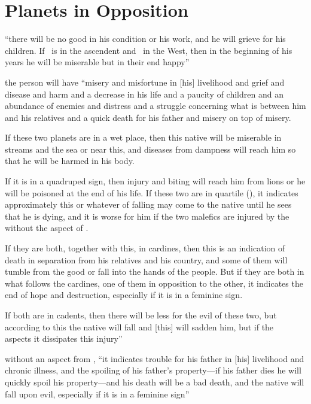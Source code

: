 \section{Planets in Opposition}
\begin{description}[style=multiline,leftmargin=1.5cm]
\item[\Saturn\Opposition\Jupiter]
``there will be no good in his condition or his work, and he will grieve for his children. If \Saturn\, is in the ascendent and \Jupiter\, in the West, then in the beginning of his years he will be miserable but in their end happy''

\item[\Saturn\Opposition\Mars] 
the person will have ``misery and misfortune in [his] livelihood and grief and disease and harm and a decrease in his life and a paucity of children and an abundance of enemies and distress and a struggle concerning what is between him and his relatives and a quick death for his father and misery on top of misery. 

If these two planets are in a wet place, then this native will be miserable in streams and the sea or near this, and diseases from dampness will reach him so that he will be harmed in his body. 

If it is in a quadruped sign, then injury and biting will reach him from lions or he will be poisoned at the end of his life. If these two are in quartile (\Square), it indicates approximately this or whatever of falling may come to the native until he sees that he is dying, and it is worse for him if the two malefics are injured by the \Moon\, without the aspect of \Jupiter. 

If they are both, together with this, in cardines, then this is an indication of death in separation from his relatives and his country, and some of them will tumble from the good or fall into the hands of the people. But if they are both in what follows the cardines, one of them in opposition to the other, it indicates the end of hope and destruction, especially if it is in a feminine sign.

If both are in cadents, then there will be less for the evil of these two, but according to this the native will fall and [this] will sadden him, but if the \Sun\, aspects it dissipates this injury''

\item[\Saturn\Opposition\Sun] without an aspect from \Jupiter, ``it indicates trouble for his father in [his] livelihood and chronic illness, and the spoiling of his father's property---if his father dies he will quickly spoil his property---and his death will be a bad death, and the native will fall upon evil, especially if it is in a feminine sign''


\end{description}
